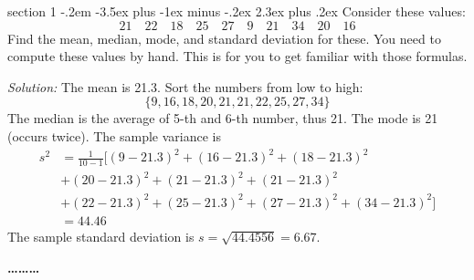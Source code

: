 \documentclass[11pt]{article}
\makeatletter
\newcommand{\ignore}[1]{}
\newenvironment{problem}{\@startsection
       {section}
       {1}
       {-.2em}
       {-3.5ex plus -1ex minus -.2ex}
       {2.3ex plus .2ex}
       {\pagebreak[3]%
       \large\bf\noindent{Problem }
       }
       }
       {%
       \begin{center}\large\bf \ldots\ldots\ldots\end{center}}
\makeatother
\begin{document}
\begin{problem}{}
Consider these values:
\[
  21 \hspace{1em}
  22 \hspace{1em}
  18 \hspace{1em}
  25 \hspace{1em}
  27 \hspace{1em}
  9 \hspace{1em}
  21 \hspace{1em}
  34 \hspace{1em}
  20 \hspace{1em}
  16 
\]
Find the mean, median, mode, and standard deviation for these. You need to compute these values by hand. This is for you to get familiar with those formulas.

\vspace{0.2cm}
\textit{Solution:} The mean is 21.3. Sort the numbers from low to high:
$$\{9, 16, 18, 20, 21, 21, 22, 25, 27, 34\}$$
The median is the average of 5-th and 6-th number, thus 21. The mode is 21 (occurs twice). 
The sample variance is 
\begin{align*}
    s^2 &=\frac{1}{10-1}\Big[  (9-21.3)^2+(16-21.3)^2+(18-21.3)^2\\
     & +(20-21.3)^2+(21-21.3)^2+(21-21.3)^2\\
     & +(22-21.3)^2+(25-21.3)^2+(27-21.3)^2+(34-21.3)^2 \Big]\\
     &= 44.46
\end{align*}
The sample standard deviation is $s=\sqrt{44.4556}=6.67$.

\end{problem}


\ignore{
\begin{problem}{}
The file \texttt{BestpaidActorsIncome.csv} contains the annual income for the Forbes Top 10 Best-paid Actors Worldwide in 2017.

Use
%
\textit{Stat $\Rightarrow$
        Basic Statistics $\Rightarrow$
        Display Descriptive Statistics}
%
to compute the mean, median and interquartile range, for the incomes.  You will need to obtain the inter-quartile range by hand as the difference between the third quartile ($Q_3$, the 75th percentile) and the first quartile ($Q_1$,the 25th percentile).  Why do you think that the mean is greater than the median? To help answer this, look back at the data set, and also create a
histogram, using \textit{Graph $\Rightarrow$ Histogram $\Rightarrow$ Simple}.

Next, remove the two largest observations, Mark Wahlberg and Dwayne Johnson by replacing their incomes in the Minitab spreadsheet by \texttt{*}
(a missing value). Recompute the mean, median and interquartile range for the modified data set. Compare with the corresponding values for the full data set. What changed and what stayed essentially the same? Why?
\end{problem}
}
\end{document}
